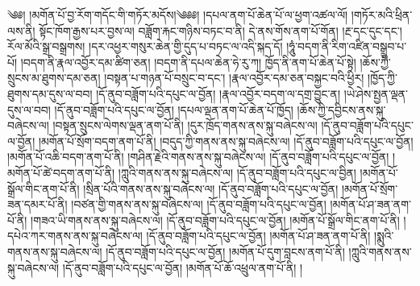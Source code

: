 \setcounter{footnote}{0} 
༄༅། །མགོན་པོ་བྱ་རོག་གདོང་གི་གཏོར་མདོས།༄༅༅། །དཔལ་ནག་པོ་ཆེན་པོ་ལ་ཕྱག་འཚལ་ལོ། །གཏོར་མའི་ཕྲིན་ལས་ནི། སྟོང་ཁོག་རྒྱས་པར་བྱས་ལ། བཟློག་རྐང་གཉིས་བཏང་བ་ནི། དེ་ནས་གོས་ནག་པོ་གོན། །རྔ་དང་དུང་དང་། རོལ་མོའི་སྒྲ་བསྒྲགས། །དར་འཕྱར་གསུར་ཆེན་གྱི་དུད་པ་བཏང་ལ་འདི་སྐད་དོ། །ཧཱུཾ་བདག་ནི་རིག་འཛིན་བསྒྲུབ་པ་པོ། །བདག་ནི་རྣལ་འབྱོར་དམ་ཚིག་ཅན། །བདག་ནི་དཔལ་ཆེན་ཧེ་རུ་ཀ། ཁྱོད་ནི་ནག་པོ་ཆེན་པོ་སྟེ། །ཆོས་ཀྱི་སྲུངས་མ་ཐུགས་དམ་ཅན། །བསྟན་པ་གཉན་པོ་བསྲུང་བ་དང་། །རྣལ་འབྱོར་དམ་ཅན་བསྐྱང་བའི་ཕྱིར། །ཁྱོད་ཀྱི་ཐུགས་དམ་དུས་ལ་བབ། །དོ་ནུབ་བཟློག་པའི་དཔུང་ལ་བྱོན། །རྣལ་འབྱོར་བདག་ལ་དགྲ་བྱུང་ན། །ཡེ་ཤེས་སྤྱན་ལྡན་དུས་ལ་བབ། །དོ་ནུབ་བཟློག་པའི་དཔུང་ལ་བྱོན། །དཔལ་ལྡན་ནག་པོ་ཆེན་པོ་ཁྱོད། །ཆོས་ཀྱི་དབྱིངས་ནས་སྐུ་བཞེངས་ལ། །བསྟན་སྲུངས་ལེགས་ལྡན་ནག་པོ་ནི། །དུར་ཁྲོད་གནས་ནས་སྐུ་བཞེངས་ལ། །དོ་ནུབ་བཟློག་པའི་དཔུང་ལ་བྱོན། །མགོན་པོ་སྲོག་བདག་ནག་པོ་ནི། །བདུད་ཀྱི་གནས་ནས་སྐུ་བཞེངས་ལ། །དོ་ནུབ་བཟློག་པའི་དཔུང་ལ་བྱོན། །མགོན་པོ་འཆི་བདག་ནག་པོ་ནི། །གཤིན་རྗེའི་གནས་ནས་སྐུ་བཞེངས་ལ། །དོ་ནུབ་བཟློག་པའི་དཔུང་ལ་བྱོན། །མགོན་པོ་ཚེ་བདག་ནག་པོ་ནི། །ཀླུའི་གནས་ནས་སྐུ་བཞེངས་ལ། །དོ་ནུབ་བཟློག་པའི་དཔུང་ལ་བྱིན། །མགོན་པོ་སྒྲོལ་གིང་ནག་པོ་ནི། །སྲིན་པོའི་གནས་ནས་སྐུ་བཞེངས་ལ། །དོ་ནུབ་བཟློག་པའི་དཔུང་ལ་བྱོན། །མགོན་པོ་སྲོག་ཟན་དམར་པོ་ནི། །བཙན་གྱི་གནས་ནས་སྐུ་བཞེངས་ལ། །དོ་ནུབ་བཟློག་པའི་དཔུང་ལ་བྱོན། །མགོན་པོ་ཤ་ཟན་ནག་པོ་ནི། །གཟའ་ཡི་གནས་ནས་སྐུ་བཞེངས་ལ། །དོ་ནུབ་བཟློག་པའི་དཔུང་ལ་བྱོན། །མགོན་པོ་སྒྲོལ་གིང་ནག་པོ་ནི། །དཔེའ་ཀར་གནས་ནས་སྐུ་བཞེངས་ལ། །དོ་ནུབ་བཟློག་པའི་དཔུང་ལ་བྱོན། །མགོན་པོ་ཤ་ཟན་ནག་པོ་ནི། །སྨུའི་གནས་ནས་སྐུ་བཞེངས་ལ། །དོ་ནུབ་བཟློག་པའི་དཔུང་ལ་བྱོན། །མགོན་པོ་དུག་བླངས་ནག་པོ་ནི། །ཀླུའི་གནས་ནས་སྐུ་བཞེངས་ལ། །དོ་ནུབ་བཟློག་པའི་དཔུང་ལ་བྱོན། །མགོན་པོ་ཆོ་འཕྲུལ་ནག་པོ་ནི། །
